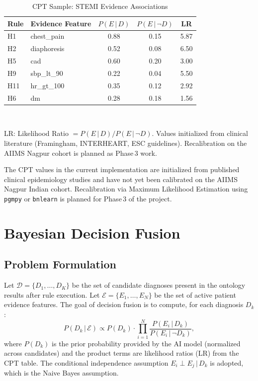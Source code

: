 \documentclass[journal]{IEEEtran}
\begin{document}
\begin{table}[!t]
\centering
\caption{CPT Sample: STEMI Evidence Associations}
\label{tab:cpt_sample}
\begin{tabular}{@{}llccc@{}}
  \toprule
  Rule & Evidence Feature & $P(E\,|\,D)$ & $P(E\,|\,\neg D)$ & LR \\
  \midrule
  H1  & chest\_pain    & 0.88 & 0.15 & 5.87 \\
  H2  & diaphoresis    & 0.52 & 0.08 & 6.50 \\
  H5  & cad            & 0.60 & 0.20 & 3.00 \\
  H9  & sbp\_lt\_90    & 0.22 & 0.04 & 5.50 \\
  H11 & hr\_gt\_100    & 0.35 & 0.12 & 2.92 \\
  H6  & dm             & 0.28 & 0.18 & 1.56 \\
  \bottomrule
\end{tabular}\\[2pt]
\raggedright
\footnotesize
LR: Likelihood Ratio $= P(E\,|\,D) / P(E\,|\,\neg D)$.
Values initialized from clinical literature (Framingham, INTERHEART,
ESC guidelines). Recalibration on the AIIMS Nagpur cohort is planned
as Phase\,3 work.
\end{table}

The CPT values in the current implementation are initialized from
published clinical epidemiology studies
\cite{antman2004acc,yusuf2004interheart} and have not yet been
calibrated on the AIIMS Nagpur Indian cohort.
Recalibration via Maximum Likelihood Estimation using \texttt{pgmpy}
or \texttt{bnlearn} is planned for Phase\,3 of the project.

\section{Bayesian Decision Fusion}
\label{sec:fusion}

\subsection{Problem Formulation}

Let $\mathcal{D} = \{D_1, \ldots, D_K\}$ be the set of candidate
diagnoses present in the ontology results after rule execution.
Let $\mathcal{E} = \{E_1, \ldots, E_N\}$ be the set of active
patient evidence features.
The goal of decision fusion is to compute, for each diagnosis $D_k$:
\begin{equation}
  P(D_k \,|\, \mathcal{E}) \propto
  P(D_k) \cdot \prod_{i=1}^{N} \frac{P(E_i \,|\, D_k)}{P(E_i \,|\, \neg D_k)},
  \label{eq:nb_full}
\end{equation}
where $P(D_k)$ is the prior probability provided by the AI model
(normalized across candidates) and the product terms are
likelihood ratios (LR) from the CPT table.
The conditional independence assumption $E_i \perp E_j \,|\, D_k$
is adopted, which is the Naive Bayes assumption.
\end{document}

